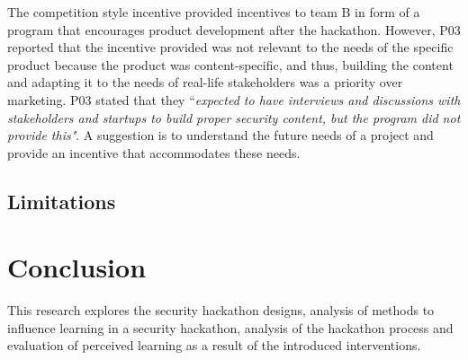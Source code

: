 \documentclass[runningheads]{llncs}
\begin{document}
The competition style incentive provided incentives to team B in form of a program that encourages product development after the hackathon. 
However, P03 reported that the incentive provided was not relevant to the needs of the specific product because the product was content-specific, and thus, building the content and adapting it to the needs of real-life stakeholders was a priority over marketing. P03 stated that they ``\textit{expected to have interviews and discussions with stakeholders and startups to build proper security content, but the program did not provide this"}. A suggestion is to understand the future needs of a project and provide an incentive that accommodates these needs.

\subsection{Limitations}

\section{Conclusion}
This research explores the security hackathon designs, analysis of methods to influence learning in a security hackathon, analysis of the hackathon process and evaluation of perceived learning as a result of the introduced interventions.



\end{document}
